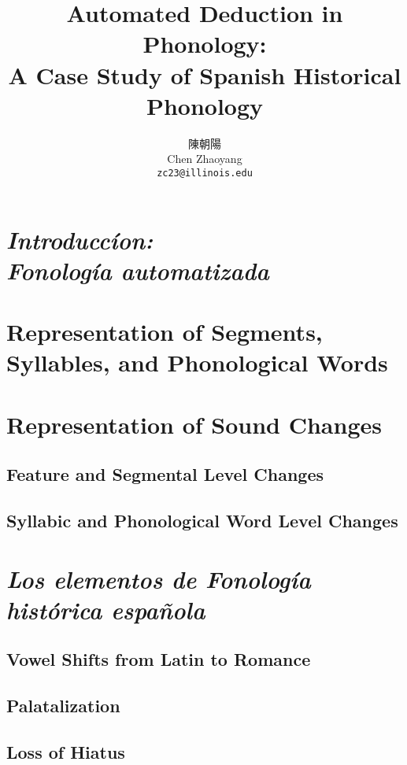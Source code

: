\documentclass{article}[12pt]
\title{Automated Deduction in Phonology: \\ A Case Study of Spanish Historical Phonology}
\author{陳朝陽 \\ Chen Zhaoyang \\ \texttt{zc23@illinois.edu}}
\begin{document}
\maketitle

\begin{abstract}

\end{abstract}

\section{\emph{Introduccíon: \\ Fonología automatizada}}

\section{Representation of Segments, Syllables, and Phonological Words}

\section{Representation of Sound Changes}

\subsection{Feature and Segmental Level Changes}

\subsection{Syllabic and Phonological Word Level Changes}

\section{\emph{Los elementos de Fonología histórica española}}

\subsection{Vowel Shifts from Latin to Romance}

\subsection{Palatalization}

\subsection{Loss of Hiatus}
\end{document}
